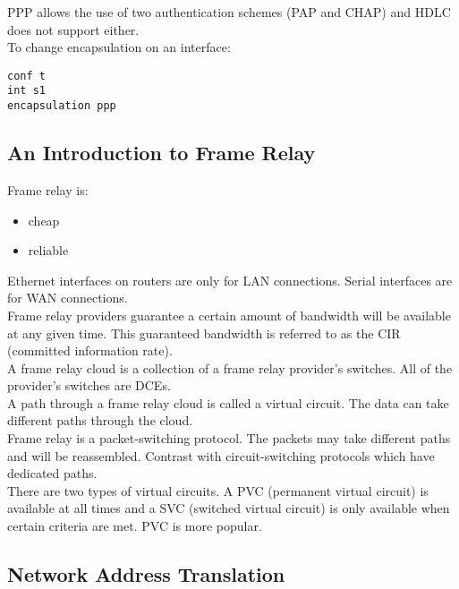 PPP allows the use of two authentication schemes (PAP and CHAP) and HDLC
does not support either.\\

To change encapsulation on an interface:

\begin{verbatim}
conf t
int s1
encapsulation ppp
\end{verbatim}

\subsection{An Introduction to Frame Relay}

Frame relay is:

\begin{itemize}
\item cheap
\item reliable
\end{itemize}

Ethernet interfaces on routers are only for LAN connections. Serial interfaces
are for WAN connections.\\

Frame relay providers guarantee a certain amount of bandwidth will be
available at any given time. This guaranteed bandwidth is referred to as
the CIR (committed information rate).\\

A frame relay cloud is a collection of a frame relay provider's switches.
All of the provider's switches are DCEs.\\

A path through a frame relay cloud is called a virtual circuit. The data
can take different paths through the cloud.\\

Frame relay is a packet-switching protocol. The packets may take different
paths and will be reassembled. Contrast with circuit-switching protocols
which have dedicated paths.\\

There are two types of virtual circuits. A PVC (permanent virtual circuit)
is available at all times and a SVC (switched virtual circuit) is only
available when certain criteria are met. PVC is more popular.

\subsection{Network Address Translation}

